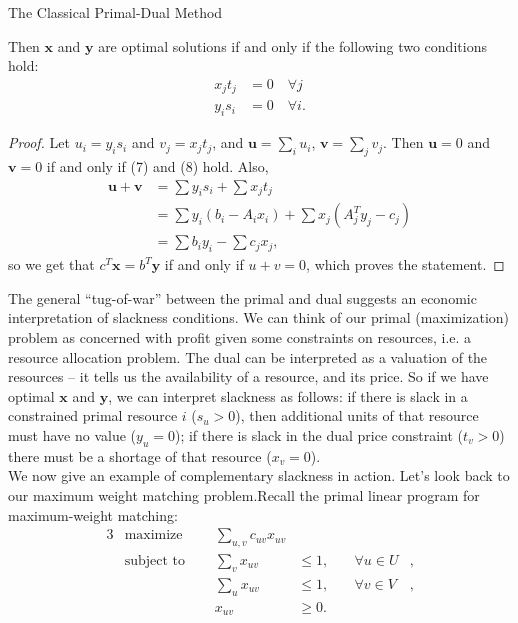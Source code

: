 \documentclass[11pt]{article}
\renewcommand{\'}{^{'}}
\newenvironment{theorem}[2][Theorem]{\begin{trivlist}
\item[\hskip \labelsep {\bfseries #1}\hskip \labelsep {\bfseries #2.}]}{\end{trivlist}}
\begin{document}
\begin{section}{The Classical Primal-Dual Method}
\begin{theorem}{}
		Then $\mathbf{x}$ and $\mathbf{y}$ are optimal solutions if and only if the following 
		two conditions hold:
		\begin{align}
			x_jt_j &= 0 \quad \forall j \\
			y_is_i &= 0 \quad \forall i.
		\end{align}
	\end{theorem}
	\begin{proof}
		Let $u_i = y_is_i$ and $v_j = x_jt_j$, and $\mathbf{u} = \sum_i u_i$, 
		$\mathbf{v} = \sum_j v_j$. Then $\mathbf{u} = 0$ and $\mathbf{v} = 0$ if and only if 
		(7) and (8) hold. Also, 
		\begin{align*}
			\mathbf{u} + \mathbf{v} &= \sum y_is_i + \sum x_jt_j \\
						&= \sum y_i(b_i - A_ix_i) + \sum x_j (A^{T}_jy_j-c_j)\\
						&= \sum b_iy_i - \sum c_jx_j,
		\end{align*}
		so we get that $c^{T}\mathbf{x} = b^{T}\mathbf{y}$ if and only if $u + v = 0$, which 
		proves the statement.	
	\end{proof}
	The general ``tug-of-war'' between the primal and dual suggests an economic interpretation 
	of slackness conditions. We can think of our primal (maximization) problem as concerned with 
	profit given some constraints on resources, i.e. a resource allocation problem. The dual can 
	be interpreted as a valuation of the resources -- it tells us the availability of a resource, 
	and its price. So if we have optimal $\mathbf{x}$ and $\mathbf{y}$, we can interpret 
	slackness as follows: if there is slack in a constrained primal resource $i$ ($s_u > 0$), 
	then additional units of that resource must have no value ($y_u = 0$); if there is slack 
	in the dual price constraint ($t_v > 0$) there must be a shortage of that resource ($x_v = 0$).\\
	We now give an example of complementary slackness in action. Let's look back to our maximum 
	weight matching problem.Recall the primal linear program for maximum-weight matching:
	\begin{alignat}{3}
		& \text{maximize } & \sum_{u,v} c_{uv} x_{uv}& \\
		& \text{subject to } \quad & \sum_{v} x_{uv} & \leq 1, & \quad \forall u\in U&, \\
				     &\quad & \sum_{u} x_{uv} & \leq 1, & \quad \forall v\in V &, \\
				&& x_{uv} & \geq 0.
	\end{alignat}

\end{section}
\end{document}
